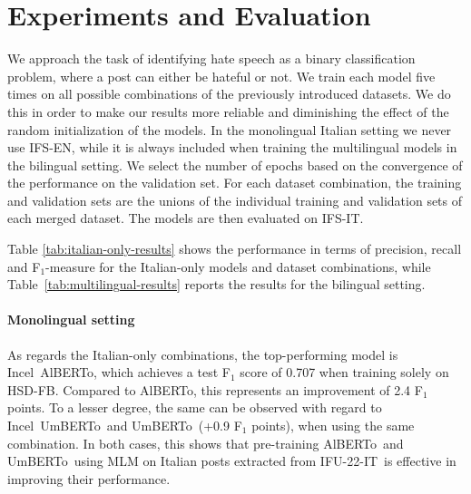 \documentclass[11pt]{article}
\newcommand{\dsITcorpus}{IFU-22-IT}
\newcommand{\dsENclassification}{IFS-EN}
\newcommand{\dsITclassification}{IFS-IT}
\newcommand{\umbert}{\mbox{UmBERTo}}
\newcommand{\albert}{\mbox{AlBERTo}}
\newcommand{\iumbert}{\mbox{Incel UmBERTo}}
\newcommand{\ialbert}{\mbox{Incel AlBERTo}}
\newcommand{\hsdfb}{\mbox{HSD-FB}}
\begin{document}
\section{Experiments and Evaluation}
\label{sec:exps}

We approach the task of identifying hate speech as a binary classification problem, where a post can either be hateful or not. We train each model five times on all possible combinations of the previously introduced datasets. We do this in order to make our results more reliable and diminishing the effect of the random initialization of the models. In the monolingual Italian setting we never use \dsENclassification, while it is always included when training the multilingual models in the bilingual setting. We select the number of epochs based on the convergence of the performance on the validation set. For each dataset combination, the training and validation sets are the unions of the individual training and validation sets of each merged dataset. The models are then evaluated on \dsITclassification.

Table \ref{tab:italian-only-results} shows the performance in terms of precision, recall and F$_1$-measure for the Italian-only models and dataset combinations, while Table~\ref{tab:multilingual-results} reports the results for the bilingual setting.


\paragraph{Monolingual setting}
As regards the Italian-only combinations, the top-performing model is \ialbert, which achieves a test F$_1$ score of 0.707 when training solely on \hsdfb. Compared to \albert, this represents an improvement of 2.4 F$_1$ points. To a lesser degree, the same can be observed with regard to \iumbert\, and \umbert\, (+0.9 F$_1$ points), when using the same combination. In both cases, this shows that pre-training \albert\, and \umbert\, using MLM on Italian posts extracted from \dsITcorpus\, is effective in improving their performance.
\end{document}
